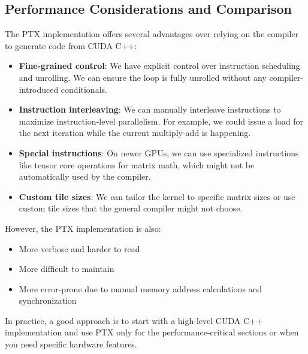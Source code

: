 \subsection{Performance Considerations and Comparison}

The PTX implementation offers several advantages over relying on the compiler to generate code from CUDA C++:

\begin{itemize}
    \item \textbf{Fine-grained control}: We have explicit control over instruction scheduling and unrolling. We can ensure the loop is fully unrolled without any compiler-introduced conditionals.
    
    \item \textbf{Instruction interleaving}: We can manually interleave instructions to maximize instruction-level parallelism. For example, we could issue a load for the next iteration while the current multiply-add is happening.
    
    \item \textbf{Special instructions}: On newer GPUs, we can use specialized instructions like tensor core operations for matrix math, which might not be automatically used by the compiler.
    
    \item \textbf{Custom tile sizes}: We can tailor the kernel to specific matrix sizes or use custom tile sizes that the general compiler might not choose.
\end{itemize}

However, the PTX implementation is also:

\begin{itemize}
    \item More verbose and harder to read
    \item More difficult to maintain
    \item More error-prone due to manual memory address calculations and synchronization
\end{itemize}

In practice, a good approach is to start with a high-level CUDA C++ implementation and use PTX only for the performance-critical sections or when you need specific hardware features.


